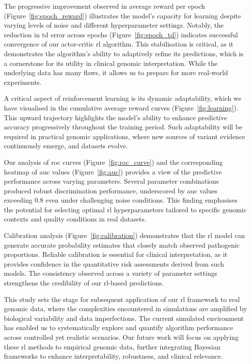 The progressive improvement observed in average reward per epoch (Figure~\ref{fig:epoch_reward}) illustrates the model's capacity for learning despite varying levels of noise and different hyperparameter settings. Notably, the reduction in \ac{td} error across epochs (Figure~\ref{fig:epoch_td}) indicates successful convergence of our actor-critic \ac{rl} algorithm. This stabilisation is critical, as it demonstrates the algorithm's ability to adaptively refine its predictions, which is a cornerstone for its utility in clinical genomic interpretation. While the underlying data has many flaws, it allows us to prepare for more real-world experiments.

A critical aspect of reinforcement learning is its dynamic adaptability, which we have visualised in the cumulative average reward curves (Figure~\ref{fig:learning}). This upward trajectory highlights the model's ability to enhance predictive accuracy progressively throughout the training period. Such adaptability will be required in practical genomic applications, where new sources of variant evidence continuously emerge, and datasets evolve.

Our analysis of \ac{roc} curves (Figure~\ref{fig:roc_curve}) and the corresponding heatmap of \ac{auc} values (Figure~\ref{fig:auc}) provides a view of the predictive performance across varying parameters. Several parameter combinations produced robust discrimination performance, underscored by \ac{auc} values exceeding 0.8 even under challenging noise conditions. This finding emphasises the potential for selecting optimal \ac{rl} hyperparameters tailored to specific genomic contexts and quality conditions in real datasets.

Calibration analysis (Figure~\ref{fig:calibration}) demonstrates that the \ac{rl} model can generate accurate probability estimates that closely match observed pathogenic proportions. Reliable calibration is essential for clinical interpretation, as it provides confidence in the quantitative risk assessments derived from such models. The consistency observed across a variety of parameter settings strengthens the credibility of our \ac{rl}-based predictions.

This study sets the stage for subsequent application of our \ac{rl} framework to real genomic data, where the complexities encountered in simulations are amplified by biological variability and data imperfections. The current simulated environment has enabled us to systematically explore and quantify algorithm performance across controlled yet realistic scenarios. Our future work will focus on applying these \ac{rl} methods to empirical genomic data, further integrating Bayesian frameworks to enhance interpretability, robustness, and clinical relevance.

